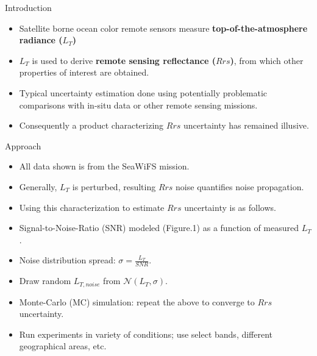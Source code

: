 \documentclass[final]{beamer}
\newlength{\onecolwid}
\begin{document}
\begin{frame}[t]
\begin{columns}[t]
\begin{column}{\onecolwid}
\begin{block}{Introduction}
	\begin{itemize}
	\item Satellite borne ocean color remote sensors measure \textbf{top-of-the-atmosphere radiance ($L_T$)}
	\item $L_T$ is used to derive \textbf{remote sensing reflectance ($Rrs$)}, from which other  properties of interest are obtained.
	\item Typical uncertainty estimation done using potentially problematic comparisons with in-situ data or other remote sensing missions\cite{BW:2006,Tle:2000,Hu:2013}.
	\item Consequently a product characterizing $Rrs$ uncertainty has remained illusive.
\end{itemize}
\end{block}


\begin{block}{Approach}
\begin{itemize}
	\item All data shown is from the SeaWiFS mission.
	\item Generally, $L_T$ is perturbed, resulting $Rrs$ noise quantifies noise propagation.
	\item Using this characterization to estimate $Rrs$ uncertainty is as follows.
	\item Signal-to-Noise-Ratio (SNR) modeled (Figure.1) as a function of measured $L_T$\cite{Barnes:1994}.
	\item Noise distribution spread: $\sigma = \frac{L_T}{SNR}$.
	\item Draw random $L_{T,noise}$ from $\mathcal{N}(L_T, \sigma)$.
	\item Monte-Carlo (MC) simulation: repeat the above to converge to  $Rrs$ uncertainty.
	\item Run experiments in variety of conditions; use select bands, different geographical areas, etc.
\end{itemize}


\end{block}
\end{column}
\end{columns}
\end{frame}
\end{document}
